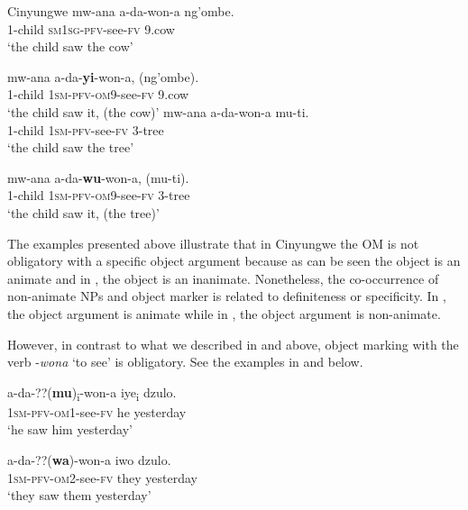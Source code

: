 \documentclass[output=paper]{langscibook}
\begin{document}
\ea\label{ex:ngunga:22}  Cinyungwe   
     \ea\label{ex:ngunga:22a} \gll  mw-ana  a-da-won-a    ng’ombe.\\
  {1}-child  {\textsc{sm1sg}-\textsc{pfv}}{}-see-{\textsc{fv}}  9.cow\\
  \glt ‘the child saw the cow’    

     \ex\label{ex:ngunga:22b} \gll mw-ana  a-da-\textbf{yi}{}-won-a,  (ng’ombe).\\
  {1}{}-child  {\textsc{1sm}-\textsc{pfv}}{}-{\textsc{om}9-}see-{\textsc{fv}}  9.cow\\
  \glt ‘the child saw it, (the cow)’
    \z
\ex\label{ex:ngunga:23}
\ea\label{ex:ngunga:23a} \gll  mw-ana  a-da-won-a    mu-ti.\\
  {1}{}-child  {\textsc{1sm}-\textsc{pfv}}{}-see-{\textsc{fv}}  3-tree\\
\glt  ‘the child saw the tree’    

\ex\label{ex:ngunga:23b} \gll mw-ana  a-da-\textbf{wu}{}-won-a,  (mu-ti).\\
  {1}{}-child  {\textsc{1sm}-\textsc{pfv}}{}-{\textsc{om}9-}see-{\textsc{fv}}  3-tree\\
\glt    ‘the child saw it, (the tree)’
    \z
\z

The examples presented above illustrate that in Cinyungwe the OM is not obligatory with a specific object argument because as can be seen  the object is an animate and in , the object is an inanimate. Nonetheless, the co-occurrence of non-animate NPs and object marker is related to definiteness or specificity. In , the object argument is animate while in , the object argument is non-animate. 

However, in contrast to what we described in  and  above, object marking with the verb -\textit{wona} ‘to see’ is obligatory. See the examples in  and  below.  

\ea\label{ex:ngunga:24}
\ea\label{ex:ngunga:24a} \gll  a-da-{??}(\textbf{mu})\textsubscript{i}{}-won-a  iye\textsubscript{i}  dzulo.\\
  {\textsc{1sm}-\textsc{pfv}}{}-{\textsc{om}1}{}-see-{\textsc{fv}}  he  yesterday\\
\glt  ‘he saw him yesterday’    

\ex\label{ex:ngunga:24b} \gll  a-da-{??}(\textbf{wa})-won-a  iwo  dzulo.\\
  {\textsc{1sm}-\textsc{pfv}}{}-{\textsc{om}2}{}-see-{\textsc{fv}}  they  yesterday\\
\glt  ‘they saw them yesterday’
\end{document}
